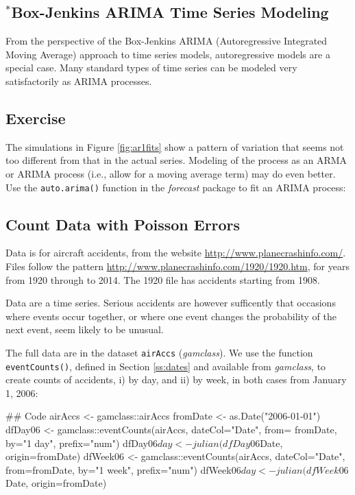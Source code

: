 \documentclass{tufte-book}\usepackage[]{graphicx}\usepackage[]{color}
\newcommand{\txtt}[1]{\texttt{#1}}
\begin{document}
\subsection{$^*$Box-Jenkins ARIMA Time Series Modeling}

From the perspective of the Box-Jenkins ARIMA (Autoregressive
Integrated Moving Average) approach to time series models,
autoregressive models are a special case.  Many standard types of time
series can be modeled very satisfactorily as ARIMA processes.

\subsection*{Exercise}
The simulations in Figure \ref{fig:ar1fits} show a pattern of
  variation that seems not too different from that in the actual series.
  Modeling of the process as an ARMA or ARIMA process (i.e., allow
  for a moving average term) may do even better.  Use the
  \txtt{auto.arima()} function in the {\em forecast} package to fit an
  ARIMA process:

\subsection{Count Data with Poisson Errors}

Data is for aircraft accidents, from the website
\url{http://www.planecrashinfo.com/}.  Files follow the pattern
\url{http://www.planecrashinfo.com/1920/1920.htm},
for years from 1920 through to 2014.  The 1920 file has
accidents starting from 1908.

Data are a time series.  Serious accidents are however sufficently
that occasions where events occur together, or where one event
changes the probability of the next event, seem likely to be
unusual.

The full data are in the dataset \txtt{airAccs} ({\em gamclass}).
We use the function \txtt{eventCounts()}, defined in Section
\ref{ss:dates} and available from {\em gamclass}, to create counts of
accidents, i) by day, and ii) by week, in both cases from January 1,
2006:

\begin{fullwidth}

\begin{Schunk}
\begin{Sinput}
## Code
airAccs <- gamclass::airAccs
fromDate <- as.Date("2006-01-01")
dfDay06 <- gamclass::eventCounts(airAccs, dateCol="Date", from= fromDate,
                                 by="1 day", prefix="num")
dfDay06$day <- julian(dfDay06$Date, origin=fromDate)
dfWeek06 <- gamclass::eventCounts(airAccs, dateCol="Date", from=fromDate,
                                  by="1 week", prefix="num")
dfWeek06$day <- julian(dfWeek06$Date, origin=fromDate)
\end{Sinput}
\end{Schunk}

\end{fullwidth}
\end{document}
